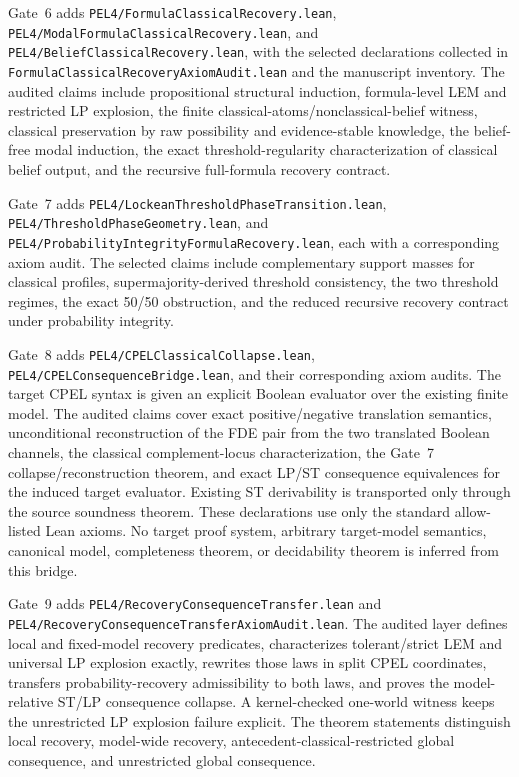 Gate~6 adds \texttt{PEL4/FormulaClassicalRecovery.lean},
\texttt{PEL4/ModalFormulaClassicalRecovery.lean}, and
\texttt{PEL4/BeliefClassicalRecovery.lean}, with the selected declarations collected
in \texttt{FormulaClassicalRecoveryAxiomAudit.lean} and the manuscript inventory.
The audited claims include propositional structural induction, formula-level LEM and
restricted LP explosion, the finite classical-atoms/nonclassical-belief witness,
classical preservation by raw possibility and evidence-stable knowledge, the
belief-free modal induction, the exact threshold-regularity characterization of
classical belief output, and the recursive full-formula recovery contract.

Gate~7 adds \texttt{PEL4/LockeanThresholdPhaseTransition.lean},
\texttt{PEL4/ThresholdPhaseGeometry.lean}, and
\texttt{PEL4/ProbabilityIntegrityFormulaRecovery.lean}, each with a corresponding
axiom audit.  The selected claims include complementary support masses for classical
profiles, supermajority-derived threshold consistency, the two threshold regimes,
the exact 50/50 obstruction, and the reduced recursive recovery contract under
probability integrity.

Gate~8 adds \texttt{PEL4/CPELClassicalCollapse.lean},
\texttt{PEL4/CPELConsequenceBridge.lean}, and their corresponding axiom audits.  The
target CPEL syntax is given an explicit Boolean evaluator over the existing finite
model.  The audited claims cover exact positive/negative translation semantics,
unconditional reconstruction of the FDE pair from the two translated Boolean
channels, the classical complement-locus characterization, the Gate~7
collapse/reconstruction theorem, and exact LP/ST consequence equivalences for the
induced target evaluator.  Existing ST derivability is transported only through the
source soundness theorem.  These declarations use only the standard allow-listed Lean
axioms.  No target proof system, arbitrary target-model semantics, canonical model,
completeness theorem, or decidability theorem is inferred from this bridge.

Gate~9 adds \texttt{PEL4/RecoveryConsequenceTransfer.lean} and
\texttt{PEL4/RecoveryConsequenceTransferAxiomAudit.lean}. The audited layer defines
local and fixed-model recovery predicates, characterizes tolerant/strict LEM and
universal LP explosion exactly, rewrites those laws in split CPEL coordinates,
transfers probability-recovery admissibility to both laws, and proves the
model-relative ST/LP consequence collapse. A kernel-checked one-world witness keeps
the unrestricted LP explosion failure explicit. The theorem statements distinguish
local recovery, model-wide recovery, antecedent-classical-restricted global
consequence, and unrestricted global consequence.


